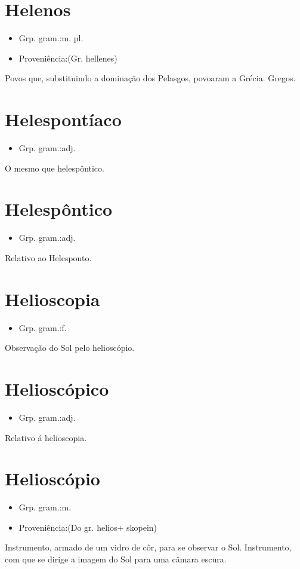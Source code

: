 \documentclass{article}
\begin{document}
\section{Helenos}
\begin{itemize}
\item {Grp. gram.:m. pl.}
\end{itemize}
\begin{itemize}
\item {Proveniência:(Gr. \textunderscore hellenes\textunderscore )}
\end{itemize}
Povos que, substituindo a dominação dos Pelasgos, povoaram a Grécia.
Gregos.
\section{Helespontíaco}
\begin{itemize}
\item {Grp. gram.:adj.}
\end{itemize}
O mesmo que \textunderscore helespôntico\textunderscore .
\section{Helespôntico}
\begin{itemize}
\item {Grp. gram.:adj.}
\end{itemize}
Relativo ao Helesponto.
\section{Helioscopia}
\begin{itemize}
\item {Grp. gram.:f.}
\end{itemize}
Observação do Sol pelo helioscópio.
\section{Helioscópico}
\begin{itemize}
\item {Grp. gram.:adj.}
\end{itemize}
Relativo á helioscopia.
\section{Helioscópio}
\begin{itemize}
\item {Grp. gram.:m.}
\end{itemize}
\begin{itemize}
\item {Proveniência:(Do gr. \textunderscore helios\textunderscore  + \textunderscore skopein\textunderscore )}
\end{itemize}
Instrumento, armado de um vidro de côr, para se observar o Sol.
Instrumento, com que se dirige a imagem do Sol para uma câmara escura.
\end{document}
